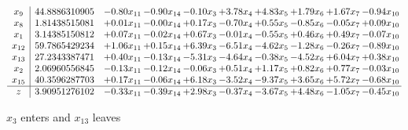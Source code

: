 \documentclass[9pt]{article}
\begin{document}
 \[\begin{array}{c| c c@{\hskip 2pt} c@{\hskip 2pt} c@{\hskip 2pt} c@{\hskip 2pt} c@{\hskip 2pt} c@{\hskip 2pt} c@{\hskip 2pt} c@{\hskip 2pt} }
 x_{9}   &  44.8886310905 & -0.80 x_{11} & -0.90 x_{14} & -0.10 x_{3} & +  3.78 x_{4} & +  4.83 x_{5} & +  1.79 x_{6} & +  1.67 x_{7} & -0.94 x_{10}\\
 x_{8}   &  1.81438515081 & +  0.01 x_{11} & -0.00 x_{14} & +  0.17 x_{3} & -0.70 x_{4} & +  0.55 x_{5} & -0.85 x_{6} & -0.05 x_{7} & +  0.09 x_{10}\\
 x_{1}   &  3.14385150812 & +  0.07 x_{11} & -0.02 x_{14} & +  0.67 x_{3} & -0.01 x_{4} & -0.55 x_{5} & +  0.46 x_{6} & +  0.49 x_{7} & -0.07 x_{10}\\
 x_{12}   &  59.7865429234 & +  1.06 x_{11} & +  0.15 x_{14} & +  6.39 x_{3} & -6.51 x_{4} & -4.62 x_{5} & -1.28 x_{6} & -0.26 x_{7} & -0.89 x_{10}\\
 x_{13}   &  27.2343387471 & +  0.40 x_{11} & -0.13 x_{14} & -5.31 x_{3} & -4.64 x_{4} & -0.38 x_{5} & -4.52 x_{6} & +  6.04 x_{7} & +  0.38 x_{10}\\
 x_{2}   &  2.06960556845 & -0.13 x_{11} & -0.12 x_{14} & -0.06 x_{3} & +  0.51 x_{4} & +  1.17 x_{5} & +  0.82 x_{6} & +  0.77 x_{7} & -0.03 x_{10}\\
 x_{15}   &  40.3596287703 & +  0.17 x_{11} & -0.06 x_{14} & +  6.18 x_{3} & -3.52 x_{4} & -9.37 x_{5} & +  3.65 x_{6} & +  5.72 x_{7} & -0.68 x_{10}\\
\hline
z    &  3.90951276102 & -0.33 x_{11} & -0.39 x_{14} & +  2.98 x_{3} & -0.37 x_{4} & -3.67 x_{5} & +  4.48 x_{6} & -1.05 x_{7} & -0.45 x_{10}\\
\end{array}\]


 $ x_{3} $ enters and $ x_{13} $ leaves 
\end{document}
